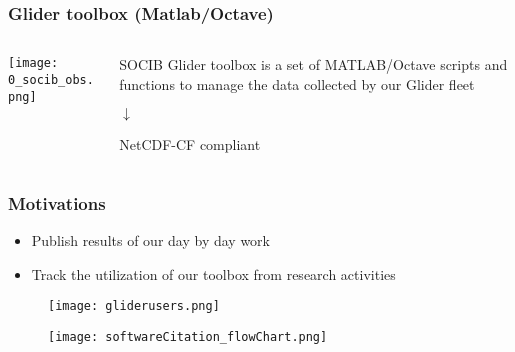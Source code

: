 \begin{frame}
\frametitle{Glider toolbox (Matlab/Octave)}

\begin{columns}

\begin{column}{0.6\textwidth}  %
    \begin{center}
     \texttt{[image: 0\_socib\_obs.png]}
     \end{center}
\end{column}

\begin{column}{0.4\textwidth}
SOCIB Glider toolbox is a set of MATLAB/Octave scripts and functions to manage the data collected by our Glider fleet

\begin{center}
$\downarrow$
\end{center}

NetCDF-CF compliant
\end{column}
\end{columns}
\end{frame}

\begin{frame}
\frametitle{Motivations}

\begin{itemize}
\item Publish results of our day by day work
\item Track the utilization of our toolbox from research activities
\end{itemize}

\begin{figure}
     \texttt{[image: gliderusers.png]}
\end{figure}
\end{frame}



\begin{frame}

\begin{figure}
     \texttt{[image: softwareCitation\_flowChart.png]}
\end{figure}
\end{frame}



